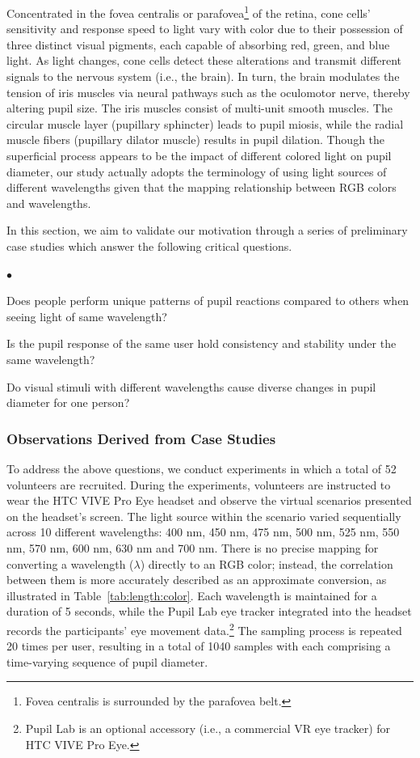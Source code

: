 \documentclass[sigconf]{acmart}
\newenvironment{packeditemize}{
\begin{list}{$\bullet$}{
\setlength{\labelwidth}{8pt}
\setlength{\itemsep}{2pt}
\setlength{\leftmargin}{\labelwidth}
\addtolength{\leftmargin}{\labelsep}
\setlength{\parindent}{0pt}
\setlength{\listparindent}{\parindent}
\setlength{\parsep}{0pt}
\setlength{\topsep}{3pt}}}{\end{list}}
\begin{document}
Concentrated in the fovea centralis or parafovea\footnote{Fovea centralis is surrounded by the parafovea belt.} of the retina, cone cells' sensitivity and response speed to light vary with color due to their possession of three distinct visual pigments, each capable of absorbing red, green, and blue light. As light changes, cone cells detect these alterations and transmit different signals to the nervous system (i.e., the brain). In turn, the brain modulates the tension of iris muscles via neural pathways such as the oculomotor nerve, thereby altering pupil size. The iris muscles consist of multi-unit smooth muscles. The circular muscle layer (pupillary sphincter) leads to pupil miosis, while the radial muscle fibers (pupillary dilator muscle) results in pupil dilation. Though the superficial process appears to be the impact of different colored light on pupil diameter, our study actually adopts the terminology of using light sources of different wavelengths given that the mapping relationship between RGB colors and wavelengths.

In this section, we aim to validate our motivation through a series of preliminary case studies which answer the following critical questions.

\begin{packeditemize}
    \item Does people perform unique patterns of pupil reactions compared to others when seeing light of same wavelength?
    \item Is the pupil response of the same user hold consistency and stability under the same wavelength?
    \item Do visual stimuli with different wavelengths cause diverse changes in pupil diameter for one person?
\end{packeditemize}


\subsubsection{Observations Derived from Case Studies}\label{sec:observations}

To address the above questions, we conduct experiments in which a total of 52 volunteers are recruited. During the experiments, volunteers are instructed to wear the HTC VIVE Pro Eye \cite{HTCViveProEye} headset and observe the virtual scenarios presented on the headset's screen. The light source within the scenario varied sequentially across 10 different wavelengths: 400 nm, 450 nm, 475 nm, 500 nm, 525 nm, 550 nm, 570 nm, 600 nm, 630 nm and 700 nm. There is no precise mapping for converting a wavelength ($\lambda$) directly to an RGB color; instead, the correlation between them is more accurately described as an approximate conversion, as illustrated in Table~\ref{tab:length:color}. Each wavelength is maintained for a duration of 5 seconds, while the Pupil Lab eye tracker \cite{PupilLab} integrated into the headset records the participants' eye movement data.\footnote{Pupil Lab is an optional accessory (i.e., a commercial VR eye tracker) for HTC VIVE Pro Eye.} 
The sampling process is repeated 20 times per user, resulting in a total of 1040 samples with each comprising a time-varying sequence of pupil diameter.
\end{document}
